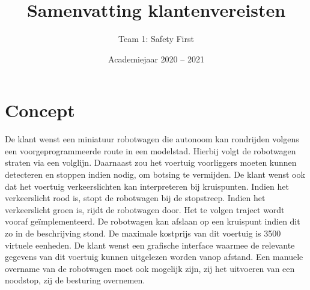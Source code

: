 \documentclass[a4paper,kulak]{kulakarticle} %
\date{Academiejaar 2020 -- 2021}
\title{Samenvatting klantenvereisten}
\author{Team 1: Safety First}
\begin{document}
\maketitle

\section{Concept}

De klant wenst een miniatuur robotwagen die autonoom kan rondrijden volgens een voorgeprogrammeerde route in een modelstad. Hierbij volgt de robotwagen straten via een volglijn. Daarnaast zou het voertuig voorliggers moeten kunnen detecteren en stoppen indien nodig, om botsing te vermijden. De klant wenst ook dat het voertuig verkeerslichten kan interpreteren bij kruispunten. Indien het verkeerslicht rood is, stopt de robotwagen bij de stopstreep. Indien het verkeerslicht groen is, rijdt de robotwagen door.  Het te volgen traject wordt vooraf geïmplementeerd. De robotwagen kan afslaan op een kruispunt indien dit zo in de beschrijving stond. De maximale kostprijs van dit voertuig is 3500 virtuele eenheden. De klant wenst een grafische interface waarmee de relevante gegevens van dit voertuig kunnen uitgelezen worden vanop afstand. Een manuele overname van de robotwagen moet ook mogelijk zijn, zij het uitvoeren van een noodstop, zij de besturing overnemen.
\end{document}
